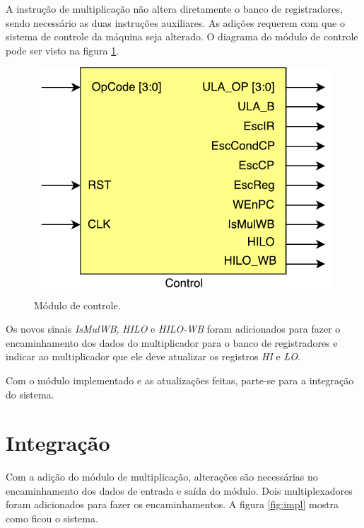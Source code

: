 \documentclass[11pt,a4paper,titlepage]{article}
\begin{document}
A instrução de multiplicação não altera diretamente o banco de registradores, sendo necessário as duas instruções auxiliares. As adições requerem com que o sistema de controle da máquina seja alterado. O diagrama do módulo de controle pode ser visto na figura \ref{fig:ctrl}.

\begin{figure}[!h]
\centering
\includegraphics[scale=0.5]{images/Control.pdf}
\caption{Módulo de controle.}
\label{fig:ctrl}
\end{figure}

Os novos sinais \textit{IsMulWB}, \textit{HILO} e \textit{HILO-WB} foram adicionados para fazer o encaminhamento dos dados do multiplicador para o banco de registradores e indicar ao multiplicador que ele deve atualizar os registros \textit{HI} e \textit{LO}.

Com o módulo implementado e as atualizações feitas, parte-se para a integração do sistema.

\section{Integração}

Com a adição do módulo de multiplicação, alterações são necessárias no encaminhamento dos dados de entrada e saída do módulo. Dois multiplexadores foram adicionados para fazer os encaminhamentos. A figura \ref{fig:impl} mostra como ficou o sistema.
\end{document}
